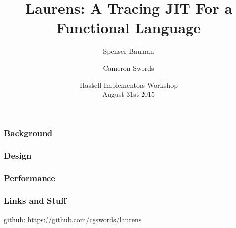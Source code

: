 \documentclass[xetex,serif,mathserif]{beamer}
\title{Laurens: A Tracing JIT For a Functional Language}
\author[shortname]{Spenser Bauman \and Cameron Swords}
\institute[shortinst]{
    Indiana University Bloomington, USA
}
\date{Haskell Implementors Workshop \\ August 31st 2015}
\newenvironment{slide}[1]{\begin{frame}\frametitle{#1}}{\end{frame}}
\begin{document}
\frame{\titlepage}

\begin{slide}{Background}
\end{slide}

\begin{slide}{Design}
\end{slide}

\begin{slide}{Performance}
\end{slide}

\begin{slide}{Links and Stuff}
    \begin{center}
        github: \href{https://github.com/cgswords/laurens}{https://github.com/cgswords/laurens}
    \end{center}
\end{slide}
\end{document}
